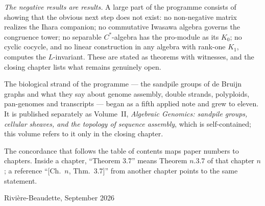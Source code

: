 \emph{The negative results are results.} A large part of the programme consists of
showing that the obvious next step does not exist: no non-negative matrix realizes the
Ihara companion; no commutative Iwasawa algebra governs the congruence tower; no
separable $C^*$-algebra has the pro-module as its $K_0$; no cyclic cocycle, and no linear
construction in any algebra with rank-one $K_1$, computes the $L$-invariant. These are
stated as theorems with witnesses, and the closing chapter lists what remains genuinely
open.

The biological strand of the programme --- the sandpile groups of de Bruijn graphs and
what they say about genome assembly, double strands, polyploids, pan-genomes and
transcripts --- began as a fifth applied note and grew to eleven. It is published
separately as Volume~II, \emph{Algebraic Genomics: sandpile groups, cellular sheaves, and
the topology of sequence assembly}, which is self-contained; this volume refers to it only
in the closing chapter.

The concordance that follows the table of contents maps paper numbers to chapters.
Inside a chapter, ``Theorem 3.7'' means Theorem $n$.3.7 of that chapter $n$; a reference
``[Ch.~$n$, Thm.~3.7]'' from another chapter points to the same statement.

\bigskip
\noindent Rivi\`ere-Beaudette, September 2026
